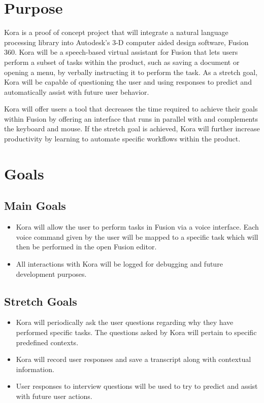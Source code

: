 \documentclass[onecolumn, draftclsnofoot,10pt, compsoc]{IEEEtran}
\begin{document}
\section{Purpose}
	Kora is a proof of concept project that will integrate a natural language processing library into Autodesk's 3-D computer aided design software, Fusion 360.
	Kora will be a speech-based virtual assistant for Fusion that lets users perform a subset of tasks within the product, such as saving a document or opening a menu, by verbally instructing it to perform the task.
	As a stretch goal, Kora will be capable of questioning the user and using responses to predict and automatically assist with future user behavior.
	
	Kora will offer users a tool that decreases the time required to achieve their goals within Fusion by offering an interface that runs in parallel with and complements the keyboard and mouse.
	If the stretch goal is achieved, Kora will further increase productivity by learning to automate specific workflows within the product.

\section{Goals}
	\subsection{Main Goals}
		\begin{itemize}
			 \item
		 	Kora will allow the user to perform tasks in Fusion via a voice interface.
			Each voice command given by the user will be mapped to a specific task which will then be performed in the open Fusion editor.
			
			\item
			All interactions with Kora will be logged for debugging and future development purposes.
			
		\end{itemize}
	\subsection{Stretch Goals}
		\begin{itemize}
			\item
			Kora will periodically ask the user questions regarding why they have performed specific tasks.
			The questions asked by Kora will pertain to specific predefined contexts.
			
			\item
			Kora will record user responses and save a transcript along with contextual information.
			
			\item
			User responses to interview questions will be used to try to predict and assist with future user actions.
		\end{itemize}
\end{document}
